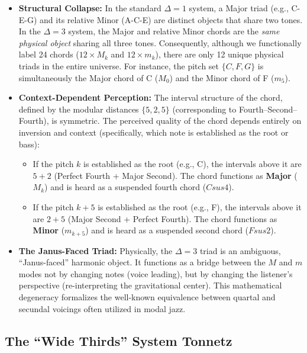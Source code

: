 \documentclass[12pt,letterpaper]{amsart}
\begin{document}
\begin{itemize}
    \item \textbf{Structural Collapse:} In the standard $\Delta=1$ system, a Major triad (e.g., C-E-G) and its relative Minor (A-C-E) are distinct objects that share two tones. In the $\Delta=3$ system, the Major and relative Minor chords are the \emph{same physical object} sharing all three tones. Consequently, although we functionally label 24 chords ($12 \times M_k$ and $12 \times m_k$), there are only 12 unique physical triads in the entire universe. For instance, the pitch set $\{C, F, G\}$ is simultaneously the Major chord of C ($M_0$) and the Minor chord of F ($m_5$).

    \item \textbf{Context-Dependent Perception:} The interval structure of the chord, defined by the modular distances $\{5, 2, 5\}$ (corresponding to Fourth--Second--Fourth), is symmetric. The perceived quality of the chord depends entirely on inversion and context (specifically, which note is established as the root or bass):
    \begin{itemize}
        \item If the pitch $k$ is established as the root (e.g., C), the intervals above it are $5+2$ (Perfect Fourth + Major Second). The chord functions as \textbf{Major} ($M_k$) and is heard as a suspended fourth chord ($Csus4$).
        \item If the pitch $k+5$ is established as the root (e.g., F), the intervals above it are $2+5$ (Major Second + Perfect Fourth). The chord functions as \textbf{Minor} ($m_{k+5}$) and is heard as a suspended second chord ($Fsus2$).
    \end{itemize}

    \item \textbf{The Janus-Faced Triad:} Physically, the $\Delta=3$ triad is an ambiguous, ``Janus-faced'' harmonic object. It functions as a bridge between the $M$ and $m$ modes not by changing notes (voice leading), but by changing the listener's perspective (re-interpreting the gravitational center). This mathematical degeneracy formalizes the well-known equivalence between quartal and secundal voicings often utilized in modal jazz.
\end{itemize}


\subsection{The ``Wide Thirds'' System Tonnetz}
\end{document}
